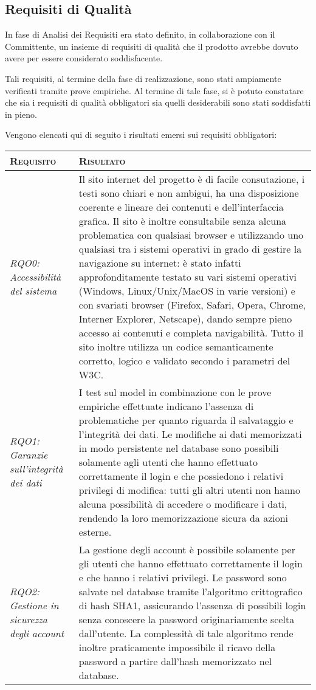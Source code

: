 \documentclass[11pt,a4paper]{article}
\begin{document}
\newpage
\subsection{Requisiti di Qualità}
In fase di Analisi dei Requisiti era stato definito, in collaborazione con il Committente, un insieme di requisiti di qualità che il prodotto avrebbe dovuto avere per essere considerato soddisfacente.

Tali requisiti, al termine della fase di realizzazione, sono stati ampiamente verificati tramite prove empiriche. Al termine di tale fase, si è potuto constatare che sia i requisiti di qualità obbligatori sia quelli desiderabili sono stati soddisfatti in pieno.

Vengono elencati qui di seguito i risultati emersi sui requisiti obbligatori:

\begin{center}
\begin{tabular}{|p{}|p{}|}
\hline
\textsc{Requisito} & \textsc{Risultato} \\
\hline
\hline
\textit{RQO0: Accessibilità del sistema} & Il sito internet del progetto è di facile consutazione, i testi sono chiari e non ambigui, 
	ha una disposizione coerente e lineare dei contenuti e dell'interfaccia grafica. Il sito è inoltre consultabile senza alcuna 
	problematica con qualsiasi browser e utilizzando uno qualsiasi tra i sistemi operativi in grado di gestire la navigazione
	su internet: è stato infatti approfonditamente testato su vari sistemi operativi (Windows, Linux/Unix/MacOS in varie versioni)
	e con svariati browser (Firefox, Safari, Opera, Chrome, Interner Explorer, Netscape), dando sempre pieno accesso ai contenuti
	e completa navigabilità. Tutto il sito inoltre utilizza un codice semanticamente corretto, logico e validato secondo i parametri del W3C. \\
\hline
\textit{RQO1: Garanzie sull’integrità dei dati} & I test sul model in combinazione con le prove empiriche effettuate indicano l'assenza di 
	problematiche per quanto riguarda il salvataggio e l'integrità dei dati. Le modifiche ai dati memorizzati in modo persistente nel database
	sono possibili solamente agli utenti che hanno effettuato correttamente il login e che possiedono i relativi privilegi di modifica:
	tutti gli altri utenti non hanno alcuna possibilità di accedere o modificare i dati, rendendo la loro memorizzazione sicura da azioni esterne. \\
\hline
\textit{RQO2: Gestione in sicurezza degli account} & La gestione degli account è possibile solamente per gli utenti che hanno effettuato correttamente
	il login e che hanno i relativi privilegi. Le password sono salvate nel database tramite l'algoritmo crittografico di hash SHA1, assicurando 
	l'assenza di possibili login senza conoscere la password originariamente scelta dall'utente. La complessità di tale algoritmo rende inoltre
	praticamente impossibile il ricavo della password a partire dall'hash memorizzato nel database. \\
\hline
\end{tabular}
\end{center}
\end{document}

